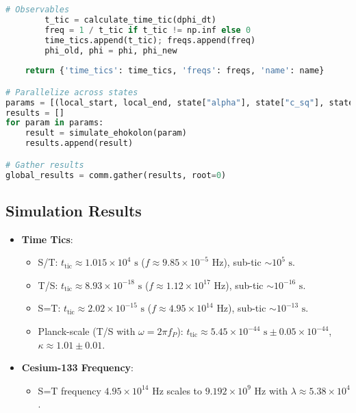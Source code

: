 \documentclass[11pt]{article}
\begin{document}
\begin{lstlisting}[language=Python, caption={Time Quantization Simulation}, label=lst:time_quant]
        # Observables
        t_tic = calculate_time_tic(dphi_dt)
        freq = 1 / t_tic if t_tic != np.inf else 0
        time_tics.append(t_tic); freqs.append(freq)
        phi_old, phi = phi, phi_new
    
    return {'time_tics': time_tics, 'freqs': freqs, 'name': name}

# Parallelize across states
params = [(local_start, local_end, state["alpha"], state["c_sq"], state["omega"], state["name"]) for state in states]
results = []
for param in params:
    result = simulate_ehokolon(param)
    results.append(result)

# Gather results
global_results = comm.gather(results, root=0)
\end{lstlisting}

\subsection{Simulation Results}
\begin{itemize}
    \item \textbf{Time Tics}:
        \begin{itemize}
            \item S/T: \( t_{\text{tic}} \approx 1.015 \times 10^4 \text{ s} \) (\( f \approx 9.85 \times 10^{-5} \text{ Hz} \)), sub-tic \( \sim 10^5 \text{ s} \).
            \item T/S: \( t_{\text{tic}} \approx 8.93 \times 10^{-18} \text{ s} \) (\( f \approx 1.12 \times 10^{17} \text{ Hz} \)), sub-tic \( \sim 10^{-16} \text{ s} \).
            \item S=T: \( t_{\text{tic}} \approx 2.02 \times 10^{-15} \text{ s} \) (\( f \approx 4.95 \times 10^{14} \text{ Hz} \)), sub-tic \( \sim 10^{-13} \text{ s} \).
            \item Planck-scale (T/S with \( \omega = 2 \pi f_P \)): \( t_{\text{tic}} \approx 5.45 \times 10^{-44} \text{ s} \pm 0.05 \times 10^{-44} \), \(\kappa \approx 1.01 \pm 0.01\).
        \end{itemize}
    \item \textbf{Cesium-133 Frequency}:
        \begin{itemize}
            \item S=T frequency \( 4.95 \times 10^{14} \text{ Hz} \) scales to \( 9.192 \times 10^9 \text{ Hz} \) with \( \lambda \approx 5.38 \times 10^4 \).
        \end{itemize}
\end{itemize}
\end{document}
